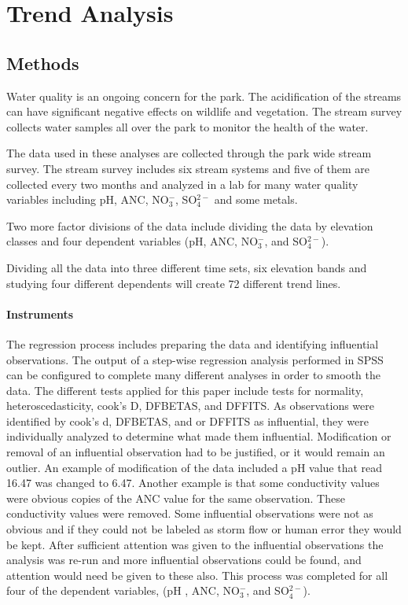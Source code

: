 \chapter{Trend Analysis}\label{ch:TA}
\section{Methods}

Water quality is an ongoing concern for the park. The acidification of the streams can have significant negative effects on wildlife and vegetation. The stream survey collects water samples all over the park to monitor the health of the water. 
    
 The data used in these analyses are collected through the park wide stream survey. The stream survey includes six stream systems and five of them are collected every two months and analyzed in a lab for many water quality variables including pH, ANC, NO$_3^-$, SO$_4^{2-}$ and some metals.  %




Two more factor divisions of the data include dividing the data by elevation classes and four dependent variables (pH, ANC, NO$_3^-$, and SO$_4^{2-}$). %

Dividing all the data into three different time sets, six elevation bands and studying four different dependents will create 72 different trend lines.

\subsubsection{Instruments}


The regression process includes preparing the data and identifying influential observations. The output of a step-wise regression analysis performed in SPSS can be configured to complete many different analyses in order to smooth the data. The different tests applied for this paper include tests for normality, heteroscedasticity, cook's D, DFBETAS, and DFFITS. As observations were identified by cook's d, DFBETAS, and or DFFITS as influential, they were individually analyzed to determine what made them influential. Modification or removal of an influential observation had to be justified, or it would remain an outlier. An example of modification of the data included a pH value that read 16.47 was changed to 6.47. Another example is that some conductivity values were obvious copies of the ANC value for the same observation. These conductivity values were removed. Some influential observations were not as obvious and if they could not be labeled as storm flow or human error they would be kept. After sufficient attention was given to the influential observations the analysis was re-run and more influential observations could be found, and attention would need be given to these also. This process was completed for all four of the dependent variables, (pH , ANC, NO$_3^-$, and SO$_4^{2-}$).
 
